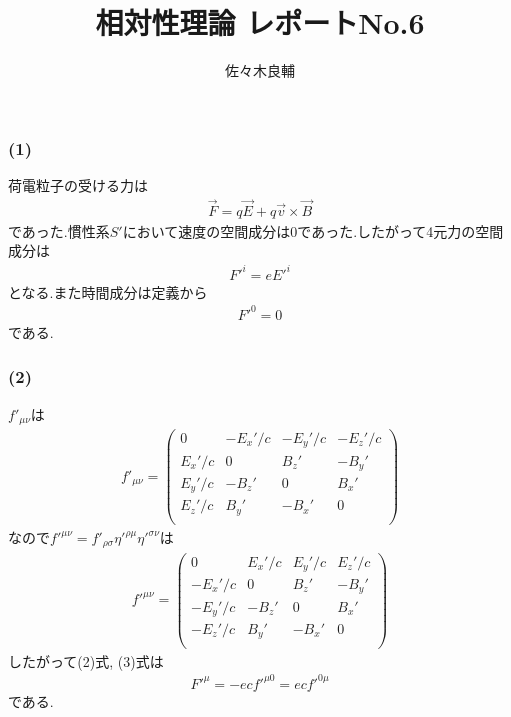 \documentclass[uplatex,a4j,11pt,dvipdfmx]{jsarticle}
\begin{document}
\title{相対性理論 レポートNo.6}
\author{佐々木良輔}
\date{}
\maketitle
\subsubsection*{(1)}
荷電粒子の受ける力は
\begin{align}
  \vec{F}=q\vec{E}+q\vec{v}\times\vec{B}
\end{align}
であった.慣性系$S'$において速度の空間成分は$0$であった.したがって4元力の空間成分は
\begin{align}
  F'^i=eE'^i
\end{align}
となる.また時間成分は定義から
\begin{align}
  F'^0=0
\end{align}
である.
\subsubsection*{(2)}
$f'_{\mu\nu}$は
\begin{align}
  f'_{\mu\nu}=\left(\begin{array}{cccc}
    0     & -E_x'/c  & -E_y'/c  & -E_z'/c\\
    E_x'/c & 0       & B_z'     & -B_y'\\
    E_y'/c & -B_z'    & 0       & B_x'\\
    E_z'/c & B_y'     & -B_x'    & 0\\
  \end{array}\right)
\end{align}
なので$f'^{\mu\nu}=f'_{\rho\sigma}\eta'^{\rho\mu}\eta'^{\sigma\nu}$は
\begin{align}
  f'^{\mu\nu}=\left(\begin{array}{cccc}
    0     & E_x'/c   & E_y'/c   & E_z'/c\\
    -E_x'/c& 0       & B_z'     & -B_y'\\
    -E_y'/c& -B_z'    & 0       & B_x'\\
    -E_z'/c& B_y'     & -B_x'    & 0\\
  \end{array}\right)
\end{align}
したがって(2)式, (3)式は
\begin{align}
  F'^\mu=-ecf'^{\mu0}=ecf'^{0\mu}
\end{align}
である.
\end{document}
